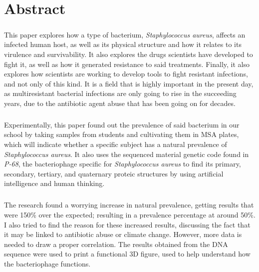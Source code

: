 \documentclass[fontsize=12pt,twoside=semi,openright,numbers=noenddot,parskip=half]{scrbook}
\begin{document}
\chapter*{Abstract}
\paragraph{}This paper explores how a type of bacterium, \emph{Staphylococcus aureus}, affects an infected human host, as well as its physical structure and how it relates to its virulence and survivability. It also explores the drugs scientists have developed to fight it, as well as how it generated resistance to said treatments. Finally, it also explores how scientists are working to develop tools to fight resistant infections, and not only of this kind. It is a field that is highly important in the present day, as multiresistant bacterial infections are only going to rise in the succeeding years, due to the antibiotic agent abuse that has been going on for decades.
\paragraph{}Experimentally, this paper found out the prevalence of said bacterium in our school by taking samples from students and cultivating them in MSA plates, which will indicate whether a specific subject has a natural prevalence of \emph{Staphylococcus aureus}. It also uses the sequenced material genetic code found in \emph{P-68}, the bacteriophage specific for \emph{Staphylococcus aureus} to find its primary, secondary, tertiary, and quaternary proteic structures by using artificial intelligence and human thinking.
\paragraph{}The research found a worrying increase in natural prevalence, getting results that were 150\% over the expected; resulting in a prevalence percentage at around 50\%. I also tried to find the reason for these increased results, discussing the fact that it may be linked to antibiotic abuse or climate change. However, more data is needed to draw a proper correlation. The results obtained from the DNA sequence were used to print a functional 3D figure,  used to help understand how the bacteriophage functions.
\end{document}
